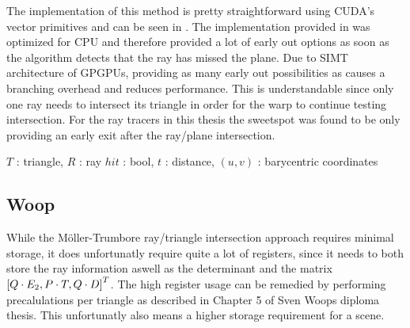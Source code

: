 The implementation of this method is pretty straightforward using
CUDA's vector primitives and can be seen in
. The implementation provided in
 was optimized for CPU and therefore
provided a lot of early out options as soon as the algorithm detects
that the ray has missed the plane. Due to SIMT architecture of GPGPUs,
providing as many early out possibilities as
 causes a branching overhead and reduces
performance. This is understandable since only one ray needs to
intersect its triangle in order for the warp to continue testing
intersection. For the ray tracers in this thesis the sweetspot was
found to be only providing an early exit after the ray/plane
intersection.

\begin{algorithm}
  \caption{Möller-Trumbore ray/triangle intersection test}
  \label{alg:moellerTrumbore}
  \begin{algorithmic}
              {$T$ : triangle, $R$ : ray}
              {$hit$ : bool, $t$ : distance, $(u,v)$ : barycentric coordinates}
              {
                \ELSE
                \ENDIF
              }
  \end{algorithmic}
\end{algorithm}

\subsection{Woop}


While the Möller-Trumbore ray/triangle intersection approach requires
minimal storage, it does unfortunatly require quite a lot of
registers, since it needs to both store the ray information aswell as
the determinant and the matrix $\left[Q \cdot E_2, P \cdot T, Q
  \cdot D \right]^T$. The high register usage can be remedied by performing
precalulations per triangle as described in Chapter 5 of Sven Woops
diploma thesis. This unfortunatly also means
a higher storage requirement for a scene.

